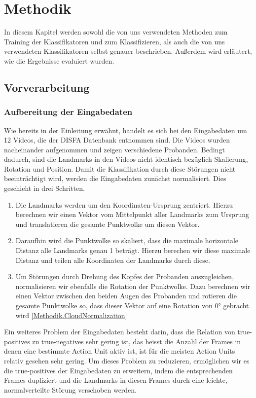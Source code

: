 \chapter{Methodik}
In diesem Kapitel werden sowohl die von uns verwendeten Methoden zum Training der Klassifikatoren und zum Klassifizieren,
als auch die von uns verwendeten Klassifikatoren selbst genauer beschrieben. Außerdem wird erläutert, wie die Ergebnisse
evaluiert wurden.

\section{Vorverarbeitung}
\subsection{Aufbereitung der Eingabedaten}
Wie bereits in der Einleitung erwähnt, handelt es sich bei den Eingabedaten um 12 Videos, die der DISFA Datenbank entnommen sind.
Die Videos wurden nacheinander aufgenommen und zeigen verschiedene Probanden. Bedingt dadurch, sind die Landmarks
in den Videos nicht identisch bezüglich Skalierung, Rotation und Position.\newline
Damit die Klassifikation durch diese Störungen nicht beeinträchtigt wird, werden die Eingabedaten zunächst normalisiert. Dies geschieht
in drei Schritten.
\begin{enumerate}
  \item Die Landmarks werden um den Koordinaten-Ursprung zentriert. Hierzu berechnen wir einen Vektor vom Mittelpunkt aller Landmarks zum Ursprung und translatieren
        die gesamte Punktwolke um diesen Vektor.
  \item Daraufhin wird die Punktwolke so skaliert, dass die maximale horizontale Distanz alle Landmarks genau 1 beträgt. Hierzu berechen wir diese maximale Distanz und
        teilen alle Koordinaten der Landmarks durch diese.
  \item Um Störungen durch Drehung des Kopfes der Probanden auszugleichen, normalisieren wir ebenfalls die Rotation der Punktwolke. Dazu berechnen wir einen Vektor
        zwischen den beiden Augen des Probanden und rotieren die gesamte Punktwolke so, dass dieser Vektor auf eine Rotation von 0° gebracht wird \ref{Methodik.CloudNormalization}
\end{enumerate}
\label{Methodik.CloudNormalization}

Ein weiteres Problem der Eingabedaten besteht darin, dass die Relation von true-positives zu true-negatives sehr gering ist, das heisst die Anzahl der Frames
in denen eine bestimmte Action Unit aktiv ist, ist für die meisten Action Units relativ gesehen sehr gering.\newline
Um dieses Problem zu reduzieren, ermöglichen wir es die true-positives der Eingabedaten zu erweitern, indem die entsprechenden Frames dupliziert
und die Landmarks in diesen Frames durch eine leichte, normalverteilte Störung verschoben werden.



